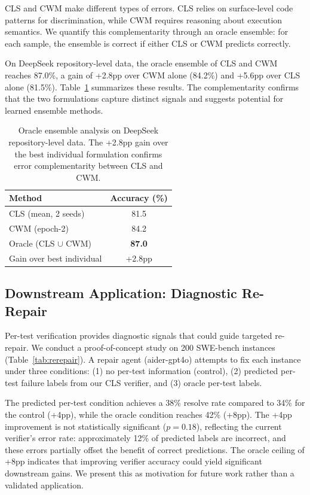 \documentclass[11pt,a4paper]{article}
\begin{document}
CLS and CWM make different types of errors.
CLS relies on surface-level code patterns for discrimination, while CWM requires reasoning about execution semantics.
We quantify this complementarity through an oracle ensemble: for each sample, the ensemble is correct if either CLS or CWM predicts correctly.

On DeepSeek repository-level data, the oracle ensemble of CLS and CWM reaches 87.0\%, a gain of +2.8pp over CWM alone (84.2\%) and +5.6pp over CLS alone (81.5\%).
Table~\ref{tab:ensemble} summarizes these results.
The complementarity confirms that the two formulations capture distinct signals and suggests potential for learned ensemble methods.

\begin{table}[t]
\centering
\small
\caption{Oracle ensemble analysis on DeepSeek repository-level data. The +2.8pp gain over the best individual formulation confirms error complementarity between CLS and CWM.}
\label{tab:ensemble}
\begin{tabular}{lc}
\toprule
Method & Accuracy (\%) \\
\midrule
CLS (mean, 2 seeds) & 81.5 \\
CWM (epoch-2) & 84.2 \\
Oracle (CLS $\cup$ CWM) & \textbf{87.0} \\
\midrule
Gain over best individual & +2.8pp \\
\bottomrule
\end{tabular}
\end{table}

\subsection{Downstream Application: Diagnostic Re-Repair}
\label{sec:rerepair}

Per-test verification provides diagnostic signals that could guide targeted re-repair.
We conduct a proof-of-concept study on 200 SWE-bench instances (Table~\ref{tab:rerepair}).
A repair agent (aider-gpt4o) attempts to fix each instance under three conditions: (1) no per-test information (control), (2) predicted per-test failure labels from our CLS verifier, and (3) oracle per-test labels.

The predicted per-test condition achieves a 38\% resolve rate compared to 34\% for the control (+4pp), while the oracle condition reaches 42\% (+8pp).
The +4pp improvement is not statistically significant ($p{=}0.18$), reflecting the current verifier's error rate: approximately 12\% of predicted labels are incorrect, and these errors partially offset the benefit of correct predictions.
The oracle ceiling of +8pp indicates that improving verifier accuracy could yield significant downstream gains.
We present this as motivation for future work rather than a validated application.
\end{document}
